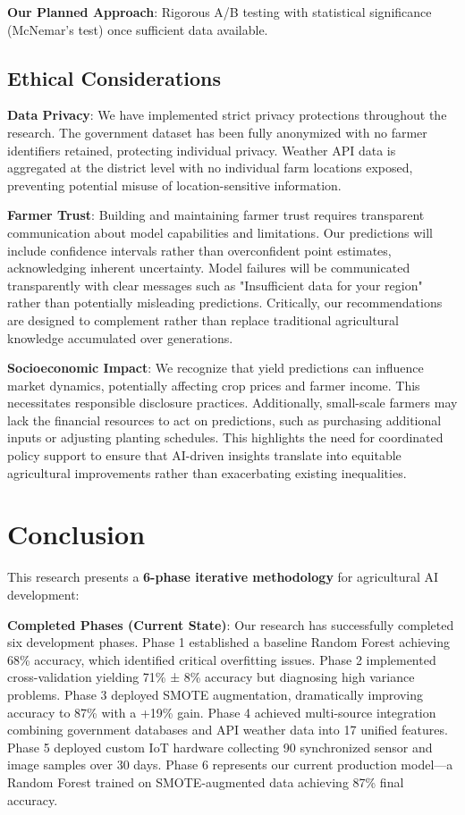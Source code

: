 \documentclass[10pt,twocolumn]{article}
\begin{document}
\textbf{Our Planned Approach}: Rigorous A/B testing with statistical significance (McNemar's test) once sufficient data available.

\subsection{Ethical Considerations}

\textbf{Data Privacy}: We have implemented strict privacy protections throughout the research. The government dataset has been fully anonymized with no farmer identifiers retained, protecting individual privacy. Weather API data is aggregated at the district level with no individual farm locations exposed, preventing potential misuse of location-sensitive information.

\textbf{Farmer Trust}: Building and maintaining farmer trust requires transparent communication about model capabilities and limitations. Our predictions will include confidence intervals rather than overconfident point estimates, acknowledging inherent uncertainty. Model failures will be communicated transparently with clear messages such as "Insufficient data for your region" rather than potentially misleading predictions. Critically, our recommendations are designed to complement rather than replace traditional agricultural knowledge accumulated over generations.

\textbf{Socioeconomic Impact}: We recognize that yield predictions can influence market dynamics, potentially affecting crop prices and farmer income. This necessitates responsible disclosure practices. Additionally, small-scale farmers may lack the financial resources to act on predictions, such as purchasing additional inputs or adjusting planting schedules. This highlights the need for coordinated policy support to ensure that AI-driven insights translate into equitable agricultural improvements rather than exacerbating existing inequalities.

\section{Conclusion}

This research presents a \textbf{6-phase iterative methodology} for agricultural AI development:

\textbf{Completed Phases (Current State)}: Our research has successfully completed six development phases. Phase 1 established a baseline Random Forest achieving 68\% accuracy, which identified critical overfitting issues. Phase 2 implemented cross-validation yielding 71\% ± 8\% accuracy but diagnosing high variance problems. Phase 3 deployed SMOTE augmentation, dramatically improving accuracy to 87\% with a +19\% gain. Phase 4 achieved multi-source integration combining government databases and API weather data into 17 unified features. Phase 5 deployed custom IoT hardware collecting 90 synchronized sensor and image samples over 30 days. Phase 6 represents our current production model—a Random Forest trained on SMOTE-augmented data achieving 87\% final accuracy.
\end{document}
